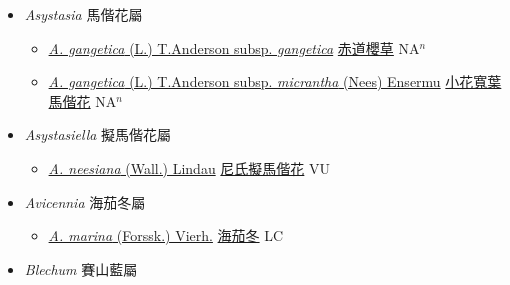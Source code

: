 
  \begin{itemize}
 \item[] \textit{Asystasia} 馬偕花屬
                    
  \begin{itemize}
        \item[] \href{http://www.theplantlist.org/tpl1.1/search?q=Asystasia+gangetica+subsp.+gangetica}{\textit{A. gangetica} (L.) T.Anderson subsp. \textit{gangetica}}   \href{\detokenize{http://taibnet.sinica.edu.tw/chi/taibnet_species_list.php?T2=赤道櫻草&T2_new_value=true&fr=y}}{赤道櫻草} NA$^n$
        \item[] \href{http://www.theplantlist.org/tpl1.1/search?q=Asystasia+gangetica+subsp.+micrantha}{\textit{A. gangetica} (L.) T.Anderson subsp. \textit{micrantha} (Nees) Ensermu}   \href{\detokenize{http://taibnet.sinica.edu.tw/chi/taibnet_species_list.php?T2=小花寬葉馬偕花&T2_new_value=true&fr=y}}{小花寬葉馬偕花} NA$^n$
  \end{itemize}
 \item[] \textit{Asystasiella} 擬馬偕花屬
                    
  \begin{itemize}
        \item[] \href{http://www.theplantlist.org/tpl1.1/search?q=Asystasiella+neesiana}{\textit{A. neesiana} (Wall.) Lindau}   \href{\detokenize{http://taibnet.sinica.edu.tw/chi/taibnet_species_list.php?T2=尼氏擬馬偕花&T2_new_value=true&fr=y}}{尼氏擬馬偕花} VU
  \end{itemize}
 \item[] \textit{Avicennia} 海茄冬屬
                    
  \begin{itemize}
        \item[] \href{http://www.theplantlist.org/tpl1.1/search?q=Avicennia+marina}{\textit{A. marina} (Forssk.) Vierh.}   \href{\detokenize{http://taibnet.sinica.edu.tw/chi/taibnet_species_list.php?T2=海茄冬&T2_new_value=true&fr=y}}{海茄冬} LC
  \end{itemize}
 \item[] \textit{Blechum} 賽山藍屬
                    

\end{itemize}

